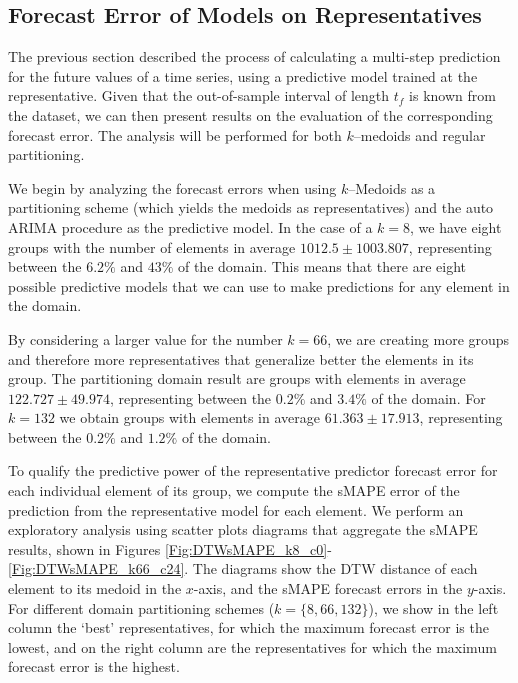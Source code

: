 \subsection{Forecast Error of Models on Representatives}
\label{Sec:AnalyzeForecastErrors}

The previous section described the process of calculating a multi-step prediction for the future values of a time series, using a predictive model trained at the representative. Given that the out-of-sample interval of length $t_f$ is known from the dataset, we can then present results on the evaluation of the corresponding forecast error. The analysis will be performed for both $k$--medoids and regular partitioning.

We begin by analyzing the forecast errors when using $k$--Medoids as a partitioning scheme (which yields the medoids as representatives) and the auto ARIMA procedure as the predictive model. In the case of a $k=8$, we have eight groups with the number of elements in average $1012.5 \pm 1003.807$, representing between the $6.2\%$ and $43\%$ of the domain. This means that there are eight possible predictive models that we can use to make predictions for any element in the domain.

By considering a larger value for the number $k=66$, we are creating more groups and therefore more representatives that generalize better the elements in its group. The partitioning domain result are groups with elements in average $122.727 \pm 49.974$, representing between the $0.2\%$ and $3.4\%$ of the domain. For $k=132$ we obtain groups with elements in average $61.363 \pm 17.913$, representing between the $0.2\%$ and $1.2\%$ of the domain.

To qualify the predictive power of the representative predictor forecast error for each individual element of its group, we compute the sMAPE error of the prediction from the representative model for each element.%
We perform an exploratory analysis using scatter plots diagrams that aggregate the sMAPE results, shown in Figures \ref{Fig:DTWsMAPE_k8_c0}-\ref{Fig:DTWsMAPE_k66_c24}. %
The diagrams show the DTW distance of each element to its medoid in the $x$-axis, and the sMAPE forecast errors in the $y$-axis. For different domain partitioning schemes ($k=\{8, 66, 132\}$), we show in the left column the `best' representatives, for which the maximum forecast error is the lowest, and on the right column are the representatives for which the maximum forecast error is the highest.

